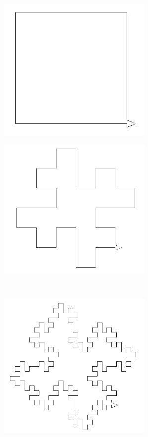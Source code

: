 \begin{center}
\begin{minipage}{7.5cm}
 \includegraphics[width=7.5cm]{pics/linden-koch1.png}
\end{minipage}
\begin{minipage}{7.5cm}
 \includegraphics[width=7.5cm]{pics/linden-koch2.png}
\end{minipage}\\
\begin{minipage}{7.5cm}
 \includegraphics[width=7.5cm]{pics/linden-koch3.png}
\end{minipage}

\end{center}
